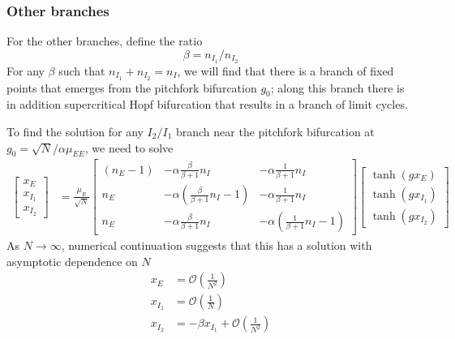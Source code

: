 \documentclass[11pt,reqno]{amsart}
\begin{document}

\subsubsection{Other branches}

For the other branches, define the ratio
\[
\beta = n_{I_1}/n_{I_2}
\]
For any $\beta$ such that $n_{I_1} + n_{I_2} = n_I$, we will find that there is a branch of fixed points that emerges from the pitchfork bifurcation $g_0$; along this branch there is in addition supercritical Hopf bifurcation that results in a branch of limit cycles.

To find the solution for any $I_2/I_1$ branch near the pitchfork bifurcation at $g_0 = \sqrt{N}/\alpha \mu_{EE}$, we need to solve
\begin{equation}\label{eq:otherbranchmatrixeq}
 \begin{aligned}
 \begin{bmatrix} x_E\\x_{I_1}\\x_{I_2}\end{bmatrix} 
 &= \frac{\mu_E}{\sqrt{N}} 
 \begin{bmatrix} (n_E - 1) & -\alpha \frac{\beta}{\beta+1} n_I & - \alpha \frac{1}{\beta+1} n_I  \\
 n_E  & -\alpha \left(\frac{\beta}{\beta+1} n_I-1\right) & - \alpha \frac{1}{\beta+1} n_I  \\
 n_E  & -\alpha \frac{\beta}{\beta+1} n_I & -\alpha \left(\frac{1}{\beta+1} n_I-1\right)
 \end{bmatrix}
 \begin{bmatrix} \tanh(g x_E) \\\tanh ( g x_{I_1} ) \\\tanh(g x_{I_2})\end{bmatrix} 
 \end{aligned}
 \end{equation}
 As $N \rightarrow \infty$, numerical continuation suggests that this has a solution with asymptotic dependence on $N$
\begin{equation}\label{eq:I1I2asymp}
\begin{aligned}
     x_E &= \mathcal{O}\left( \frac{1}{N^2} \right) \\
     x_{I_1} &= \mathcal{O}\left( \frac{1}{N} \right) \\
     x_{I_2} &= -\beta x_{I_1} + \mathcal{O}\left( \frac{1}{N^2} \right) 
 \end{aligned}
 \end{equation}
\end{document}
